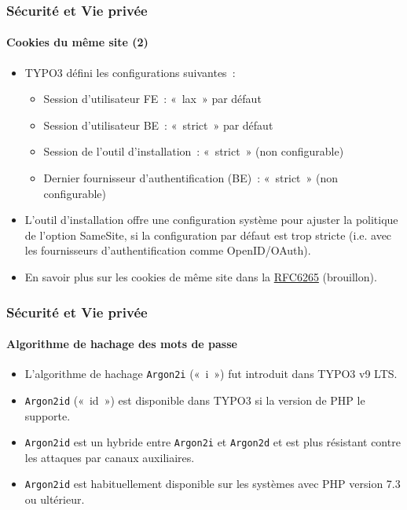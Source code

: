 
\begin{frame}[fragile]
	\frametitle{Sécurité et Vie privée}
	\framesubtitle{Cookies du même site (2)}

	\begin{itemize}
		\item TYPO3 défini les configurations suivantes~:

			\begin{itemize}\small
				\item Session d'utilisateur FE~: «~lax~» par défaut
				\item Session d'utilisateur BE~: «~strict~» par défaut
				\item Session de l'outil d'installation~: «~strict~» (non configurable)
				\item Dernier fournisseur d'authentification (BE)~: «~strict~» (non configurable)
			\end{itemize}\normalsize

		\item L'outil d'installation offre une configuration système pour ajuster
			la politique de l'option SameSite, si la configuration par défaut est trop stricte
			(i.e. avec les fournisseurs d'authentification comme OpenID/OAuth).

		\item En savoir plus sur les cookies de même site dans la
			\href{https://tools.ietf.org/html/draft-ietf-httpbis-cookie-same-site-00}{RFC6265} (brouillon).
	\end{itemize}

\end{frame}


\begin{frame}[fragile]
	\frametitle{Sécurité et Vie privée}
	\framesubtitle{Algorithme de hachage des mots de passe}

	\begin{itemize}
		\item L'algorithme de hachage \texttt{Argon2i} («~i~») fut introduit dans TYPO3 v9 LTS.
		\item \texttt{Argon2id} («~id~») est disponible dans TYPO3 si la version de PHP le supporte.
		\item \texttt{Argon2id} est un hybride entre \texttt{Argon2i} et \texttt{Argon2d}
			et est plus résistant contre les attaques par canaux auxiliaires.
		\item \texttt{Argon2id} est habituellement disponible sur les systèmes avec PHP version 7.3 ou ultérieur.
	\end{itemize}

\end{frame}

